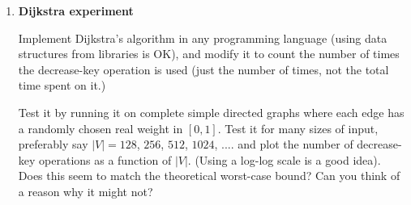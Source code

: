 \documentclass[12pt, letterpaper]{article}
\begin{document}
\begin{enumerate}
\-\ \newpage
\item \textbf{Dijkstra experiment}

Implement Dijkstra's algorithm in any programming language (using data structures from libraries is OK), and modify
it to count
the number of times the decrease-key operation is used (just the number of times, not the total time spent on it.)

Test it by running it on complete simple directed graphs where each edge has a randomly chosen real weight in $[0,1]$.  
Test it for many sizes of input, preferably  say $|V|=128$, $256$, $512$, $1024$, ....    
and plot the number of decrease-key operations  as a function of $|V|$. (Using a log-log scale is a good idea).  Does
this seem to match the theoretical worst-case bound?  Can you think of a reason why it might not?  

\end{enumerate}
\end{document}
